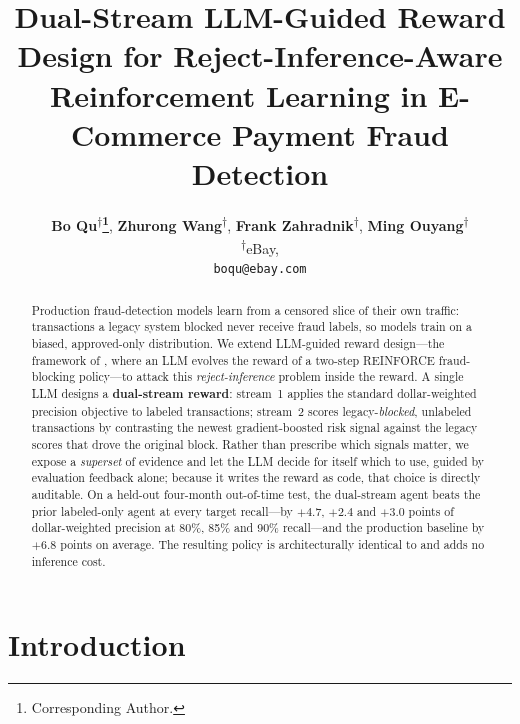 \documentclass[11pt]{article}
\title{Dual-Stream LLM-Guided Reward Design for Reject-Inference-Aware\\
Reinforcement Learning in E-Commerce Payment Fraud Detection}
\author{%
     \textbf{Bo Qu\textsuperscript{\ensuremath{\dagger}}\thanks{Corresponding Author.}},
      \textbf{Zhurong Wang\textsuperscript{\ensuremath{\dagger}}},
    \textbf{Frank Zahradnik\textsuperscript{\ensuremath{\dagger}}},
     \textbf{Ming Ouyang\textsuperscript{\ensuremath{\dagger}}}
    \\
     \textsuperscript{\ensuremath{\dagger}}eBay,
     \\
\texttt{{boqu@ebay.com}}
  }
\begin{document}
\maketitle

\begin{abstract}
Production fraud-detection models learn from a censored slice of their own traffic:
transactions a legacy system blocked never receive fraud labels, so models train on a biased,
approved-only distribution. We extend LLM-guided reward design---the
framework
of \citet{qu2025llmenhanced}, where an LLM evolves the reward of a two-step
REINFORCE fraud-blocking policy---to attack this \emph{reject-inference} problem inside the
reward. A single LLM designs a \textbf{dual-stream reward}: stream~1 applies the standard
dollar-weighted precision objective to labeled transactions; stream~2 scores
legacy-\emph{blocked}, unlabeled transactions by contrasting the newest gradient-boosted risk
signal against the legacy scores that drove the original block. Rather than prescribe which
signals matter, we expose a \emph{superset} of evidence and let the LLM decide for itself which to
use, guided by evaluation feedback alone; because it writes the reward as code, that choice is
directly auditable.
On a held-out four-month out-of-time test, the dual-stream agent beats the prior
labeled-only agent at every target recall---by $+4.7$, $+2.4$ and $+3.0$ points of
dollar-weighted precision at 80\%, 85\% and 90\% recall---and the production baseline by $+6.8$
points on average. The resulting policy is architecturally identical to
\citet{qu2025llmenhanced} and adds no inference cost.
\end{abstract}

\section{Introduction}
\end{document}
